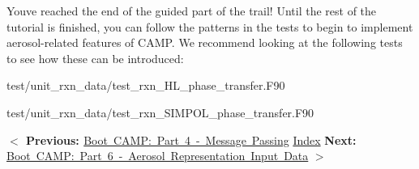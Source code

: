 You\textquotesingle{}ve reached the end of the guided part of the trail! Until the rest of the tutorial is finished, you can follow the patterns in the tests to begin to implement aerosol-\/related features of CAMP. We recommend looking at the following tests to see how these can be introduced\+:


\begin{DoxyItemize}
\item {\ttfamily test/unit\+\_\+rxn\+\_\+data/test\+\_\+rxn\+\_\+\+HL\+\_\+phase\+\_\+transfer.\+F90}
\item {\ttfamily test/unit\+\_\+rxn\+\_\+data/test\+\_\+rxn\+\_\+\+SIMPOL\+\_\+phase\+\_\+transfer.\+F90}
\end{DoxyItemize}

 {\bfseries{ $<$ Previous\+: }} \mbox{\hyperlink{camp_tutorial_part_4}{Boot CAMP\+: Part 4 -\/ Message Passing}}  \mbox{\hyperlink{camp_tutorial}{Index}}  {\bfseries{ Next\+: }} \mbox{\hyperlink{camp_tutorial_part_6}{Boot CAMP\+: Part 6 -\/ Aerosol Representation Input Data}} {\bfseries{ $>$ }} 